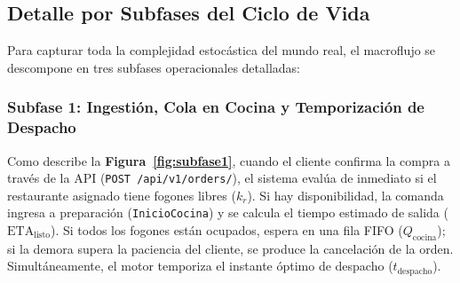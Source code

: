 \documentclass[11pt,a4paper]{article}
\begin{document}
\subsection{Detalle por Subfases del Ciclo de Vida}
Para capturar toda la complejidad estocástica del mundo real, el macroflujo se descompone en tres subfases operacionales detalladas:

\subsubsection{Subfase 1: Ingestión, Cola en Cocina y Temporización de Despacho}
Como describe la \textbf{Figura~\ref{fig:subfase1}}, cuando el cliente confirma la compra a través de la API (\texttt{POST /api/v1/orders/}), el sistema evalúa de inmediato si el restaurante asignado tiene fogones libres ($k_r$). Si hay disponibilidad, la comanda ingresa a preparación (\texttt{InicioCocina}) y se calcula el tiempo estimado de salida ($\text{ETA}_{\text{listo}}$). Si todos los fogones están ocupados, espera en una fila FIFO ($Q_{\text{cocina}}$); si la demora supera la paciencia del cliente, se produce la cancelación de la orden. Simultáneamente, el motor temporiza el instante óptimo de despacho ($t_{\text{despacho}}$).
\end{document}
